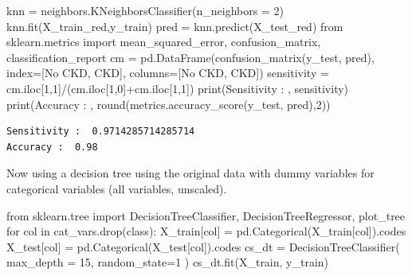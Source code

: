 \documentclass[
  11pt,
  letterpaper,
  DIV=11,
  numbers=noendperiod]{scrartcl}
\newenvironment{Shaded}{\begin{snugshade}}{\end{snugshade}}
\newcommand{\BuiltInTok}[1]{\textcolor[rgb]{0.00,0.23,0.31}{#1}}
\newcommand{\ControlFlowTok}[1]{\textcolor[rgb]{0.00,0.23,0.31}{#1}}
\newcommand{\DecValTok}[1]{\textcolor[rgb]{0.68,0.00,0.00}{#1}}
\newcommand{\ImportTok}[1]{\textcolor[rgb]{0.00,0.46,0.62}{#1}}
\newcommand{\KeywordTok}[1]{\textcolor[rgb]{0.00,0.23,0.31}{#1}}
\newcommand{\NormalTok}[1]{\textcolor[rgb]{0.00,0.23,0.31}{#1}}
\newcommand{\OperatorTok}[1]{\textcolor[rgb]{0.37,0.37,0.37}{#1}}
\newcommand{\StringTok}[1]{\textcolor[rgb]{0.13,0.47,0.30}{#1}}
\begin{document}
\begin{Shaded}
\begin{Highlighting}[]
\NormalTok{knn }\OperatorTok{=}\NormalTok{ neighbors.KNeighborsClassifier(n\_neighbors }\OperatorTok{=} \DecValTok{2}\NormalTok{)}
\NormalTok{knn.fit(X\_train\_red,y\_train)}
\NormalTok{pred }\OperatorTok{=}\NormalTok{ knn.predict(X\_test\_red)}
\ImportTok{from}\NormalTok{ sklearn.metrics }\ImportTok{import}\NormalTok{ mean\_squared\_error, confusion\_matrix, classification\_report}
\NormalTok{cm }\OperatorTok{=}\NormalTok{ pd.DataFrame(confusion\_matrix(y\_test, pred), index}\OperatorTok{=}\NormalTok{[}\StringTok{\textquotesingle{}No CKD\textquotesingle{}}\NormalTok{, }\StringTok{\textquotesingle{}CKD\textquotesingle{}}\NormalTok{], columns}\OperatorTok{=}\NormalTok{[}\StringTok{\textquotesingle{}No CKD\textquotesingle{}}\NormalTok{, }\StringTok{\textquotesingle{}CKD\textquotesingle{}}\NormalTok{])}
\NormalTok{sensitivity }\OperatorTok{=}\NormalTok{ cm.iloc[}\DecValTok{1}\NormalTok{,}\DecValTok{1}\NormalTok{]}\OperatorTok{/}\NormalTok{(cm.iloc[}\DecValTok{1}\NormalTok{,}\DecValTok{0}\NormalTok{]}\OperatorTok{+}\NormalTok{cm.iloc[}\DecValTok{1}\NormalTok{,}\DecValTok{1}\NormalTok{])}
\BuiltInTok{print}\NormalTok{(}\StringTok{\textquotesingle{}Sensitivity : \textquotesingle{}}\NormalTok{, sensitivity)}
\BuiltInTok{print}\NormalTok{(}\StringTok{\textquotesingle{}Accuracy : \textquotesingle{}}\NormalTok{, }\BuiltInTok{round}\NormalTok{(metrics.accuracy\_score(y\_test, pred),}\DecValTok{2}\NormalTok{))}
\end{Highlighting}
\end{Shaded}

\begin{verbatim}
Sensitivity :  0.9714285714285714
Accuracy :  0.98
\end{verbatim}

Now using a decision tree using the original data with dummy variables
for categorical variables (all variables, unscaled).

\begin{Shaded}
\begin{Highlighting}[]
\ImportTok{from}\NormalTok{ sklearn.tree }\ImportTok{import}\NormalTok{ DecisionTreeClassifier, DecisionTreeRegressor, plot\_tree}
\ControlFlowTok{for}\NormalTok{ col }\KeywordTok{in}\NormalTok{ cat\_vars.drop(}\StringTok{\textquotesingle{}class\textquotesingle{}}\NormalTok{):}
\NormalTok{    X\_train[col] }\OperatorTok{=}\NormalTok{ pd.Categorical(X\_train[col]).codes}
\NormalTok{    X\_test[col] }\OperatorTok{=}\NormalTok{ pd.Categorical(X\_test[col]).codes}
\NormalTok{cs\_dt }\OperatorTok{=}\NormalTok{ DecisionTreeClassifier(}
\NormalTok{    max\_depth }\OperatorTok{=} \DecValTok{15}\NormalTok{, }
\NormalTok{    random\_state}\OperatorTok{=}\DecValTok{1}
\NormalTok{) }
\NormalTok{cs\_dt.fit(X\_train, y\_train)}
\end{Highlighting}
\end{Shaded}
\end{document}
